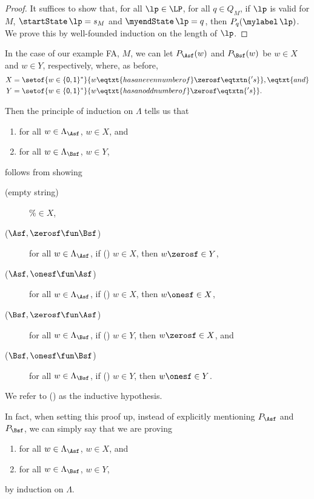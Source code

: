 \begin{proof}
It suffices to show that, for all $\lp\in\LP$, for all $q\in Q_M$,
if $\lp$ is valid for $M$, $\startState\,\lp = s_M$ and
$\myendState\,\lp = q$, then $P_q(\mylabel\,\lp)$.  We prove this by
well-founded induction on the length of $\lp$.
\end{proof}

In the case of our example FA, $M$, we can let $P_\Asf(w)$ and $P_\Bsf(w)$ be
$w\in X$ and $w\in Y$, respectively, where, as before,
\begin{align*}
X &= \setof{w\in\{\mathsf{0,1}\}^*}{w\eqtxt{has an even number of}
\zerosf\eqtxtn{'s}} , \eqtxt{and}\\
Y &= \setof{w\in\{\mathsf{0,1}\}^*}{w\eqtxt{has an odd number of}
\zerosf\eqtxtn{'s}} .
\end{align*}

Then the principle of induction on $\Lambda$ tells us that
\begin{enumerate}[\quad(A)]
\item for all $w\in\Lambda_\Asf$, $w\in X$, and

\item for all $w\in\Lambda_\Bsf$, $w\in Y$,
\end{enumerate}
follows from showing
\begin{description}
\item[\quad(empty string)] $\%\in X$,

\item[\quad($\Asf, \zerosf\fun\Bsf$)] for all $w\in\Lambda_\Asf$, if
  (\dag) $w\in X$, then $w\zerosf\in Y$,

\item[\quad($\Asf, \onesf\fun\Asf$)] for all $w\in\Lambda_\Asf$, if
  (\dag) $w\in X$, then $w\onesf\in X$,

\item[\quad($\Bsf, \zerosf\fun\Asf$)] for all $w\in\Lambda_\Bsf$, if
  (\dag) $w\in Y$, then $w\zerosf\in X$, and

\item[\quad($\Bsf, \onesf\fun\Bsf$)] for all $w\in\Lambda_\Bsf$, if
  (\dag) $w\in Y$, then $w\onesf\in Y$.
\end{description}
We refer to (\dag) as the inductive hypothesis.

In fact, when setting this proof up, instead of explicitly mentioning
$P_\Asf$ and $P_\Bsf$, we can simply say that we are proving
\begin{enumerate}[\quad(A)]
\item for all $w\in\Lambda_\Asf$, $w\in X$, and

\item for all $w\in\Lambda_\Bsf$, $w\in Y$,
\end{enumerate}
by induction on $\Lambda$.

